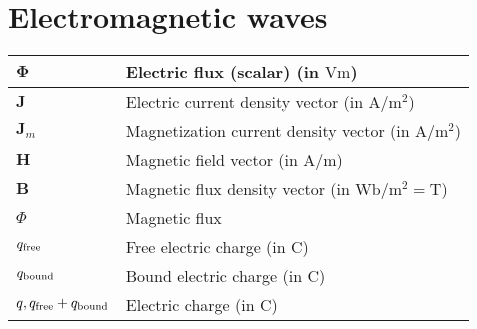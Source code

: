 \section{Electromagnetic waves}
\begin{xltabular}{\textwidth}{XX}
	\(\mathbf{\Phi}\)                                            & Electric flux (scalar) (in \(\si{\volt\meter}\))                                                                                                                                         \\ \hline
	\(\mathbf{J}\)                                               & Electric current density vector (in \(\si{\ampere\per\square\meter}\))                                                                                                                   \\ \hline
	\(\mathbf{J}_m\)\cite{chengFieldWaveElectromagnetics1989}                                               & Magnetization current density vector (in \(\si{\ampere\per\meter\squared}\))                                                                                                                   \\ \hline
	\(\mathbf{H}\)                                               & Magnetic field vector (in \(\si{\ampere\per\meter}\))                                                                                                                                    \\ \hline
	\(\mathbf{B}\)                                               & Magnetic flux density vector (in \(\si{\weber\per\meter\squared} = \si{\tesla}\))                                                                                                        \\ \hline
	\(\Phi\)\cite{chengFieldWaveElectromagnetics1989}              & Magnetic flux \\ \hline
	\(q_{\textnormal{free}}\)                                    & Free electric charge (in \(\si{\coulomb}\))                                                                                                                                              \\ \hline
	\(q_{\textnormal{bound}}\)                                   & Bound electric charge (in \(\si{\coulomb}\))                                                                                                                                             \\ \hline
	\(q, q_{\textnormal{free}}+q_{\textnormal{bound}}\)          & Electric charge (in \(\si{\coulomb}\))                                                                                                                                                   \\ \hline

\end{xltabular}
